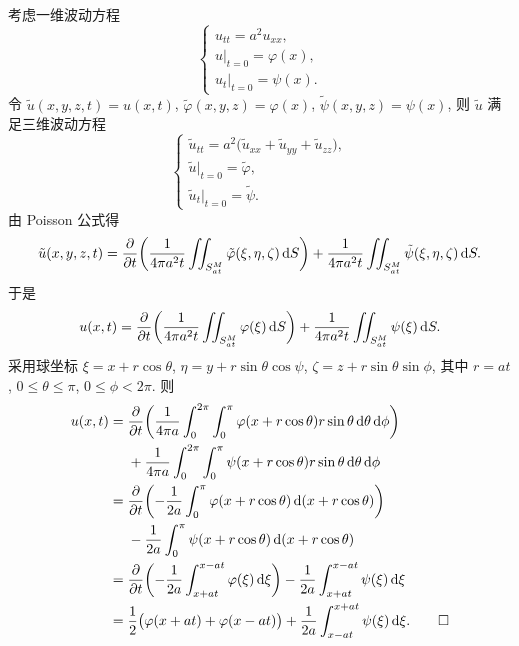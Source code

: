 \begin{solve}
  考虑一维波动方程
  \[\begin{cases}
    u_{tt} = a^2 u_{xx}, \\
    u|_{t=0} = \varphi(x), \\
    u_t|_{t=0} = \psi(x).
  \end{cases}\]
  令 $\tilde{u}(x,y,z,t) = u(x,t)$, $\tilde{\varphi}(x,y,z) = \varphi(x)$,
  $\tilde{\psi}(x,y,z) = \psi(x)$, 则 $\tilde{u}$ 满足三维波动方程
  \[\begin{cases}
    \tilde{u}_{tt} = a^2 \bigl(\tilde{u}_{xx} + \tilde{u}_{yy} + \tilde{u}_{zz}\bigr), \\
    \tilde{u}|_{t=0} = \tilde{\varphi}, \\
    \tilde{u}_t|_{t=0} = \tilde{\psi}.
  \end{cases}\]
  由 Poisson 公式得
  \[
    \tilde{u}(x, y, z, t) = \frac{\partial}{\partial t}
      \biggl(\frac{1}{4\pi a^2t} \iint_{S_{at}^M} \tilde{\varphi}(\xi,\eta,\zeta)\mathop{}\!\mathrm{d} S\biggr)
      + \frac{1}{4\pi a^2t} \iint_{S_{at}^M} \tilde{\psi}(\xi,\eta,\zeta)\mathop{}\!\mathrm{d} S.
  \]
  于是
  \[
    u(x,t)
    = \frac{\partial}{\partial t}
      \biggl(\frac{1}{4\pi a^2t} \iint_{S_{at}^M} \varphi(\xi)\mathop{}\!\mathrm{d} S\biggr)
      + \frac{1}{4\pi a^2t} \iint_{S_{at}^M} \psi(\xi)\mathop{}\!\mathrm{d} S.
  \]
  采用球坐标 $\xi = x + r\cos\theta$, $\eta = y + r\sin\theta\cos\psi$,
  $\zeta = z + r\sin\theta\sin\phi$, 其中 $r=at$, $0\leq\theta\leq\pi$,
  $0\leq\phi < 2\pi$. 则
  \begin{align*}
    u(x,t)
    ={} & \frac{\partial}{\partial t}
          \biggl(\frac{1}{4\pi a} \int_0^{2\pi} \int_0^{\pi} \varphi(x+r\cos\theta)
          r\sin\theta \diff\theta\diff\phi\biggr) \\
        & + \frac{1}{4\pi a} \int_0^{2\pi} \int_0^{\pi} \psi(x+r\cos\theta)
          r\sin\theta \diff\theta\diff\phi  \\
    ={} & \frac{\partial}{\partial t}
          \biggl(-\frac{1}{2a} \int_0^{\pi} \varphi(x+r\cos\theta) 
          \diff (x+r\cos\theta)\biggr) \\
        &  - \frac{1}{2a} \int_0^{\pi} \psi(x+r\cos\theta) \diff (x+r\cos\theta) \\
    ={} & \frac{\partial}{\partial t}
          \biggl(-\frac{1}{2a} \int_{x+at}^{x-at} \varphi(\xi) \diff\xi\biggr)
          - \frac{1}{2a} \int_{x+at}^{x-at} \psi(\xi) \diff\xi \\
    ={} & \frac{1}{2}\bigl(\varphi(x+at) + \varphi(x-at)\bigr)
          + \frac{1}{2a}\int_{x-at}^{x+at} \psi(\xi)\diff\xi. \qedhere
  \end{align*}
\end{solve}


